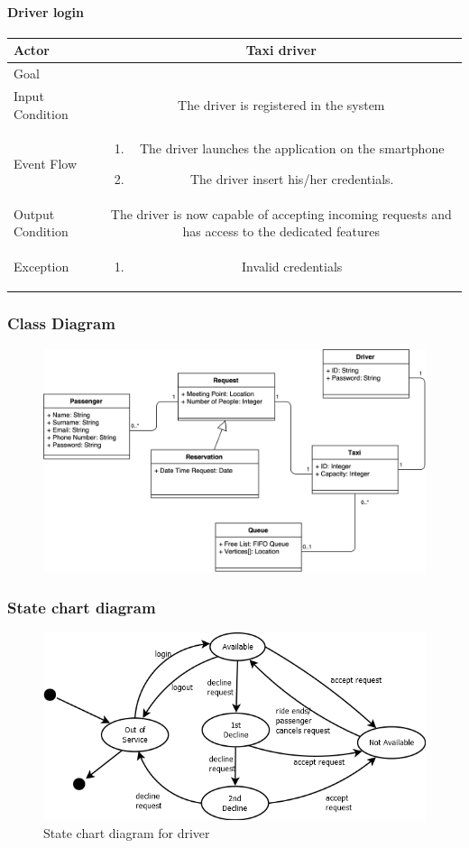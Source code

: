 \documentclass[a4paper,12pt]{article}%
\newcommand{\usecasetable}[6]{
\begin{center}
\def\arraystretch{1.5}
\begin{tabularx}{\textwidth}{|s|C|}
\hline
Actor & #1\\
\hline
Goal & #2\\
\hline
Input Condition & #3 \\
\hline
Event Flow & #4\\
\hline
Output Condition & #5\\
\hline
Exception & #6\\
\hline
\end{tabularx}
\end{center}
}
\begin{document}
\paragraph{Driver login}
\usecasetable{Taxi driver}{}{The driver is registered in the system}
{
\begin{minipage}[b]{11cm}
\begin{enumerate}
\item The driver launches the application on the smartphone
\item The driver insert his/her credentials.
\end{enumerate}
\end{minipage}
}
{The driver is now capable of accepting incoming requests and has access to the dedicated features}
{
\begin{minipage}[b]{11cm}
\begin{enumerate}
\item Invalid credentials
\end{enumerate}
\end{minipage}
}
\break
\begin{landscape}
\subsubsection{Class Diagram}
\begin{figure}[H]
\includegraphics[scale=.25]{class_diagram.png}
\end{figure}
\end{landscape}
\break
\subsubsection{State chart diagram}
\begin{figure}[H]
\centering
\includegraphics[scale=.7]{state_chart_driver.png}
\caption{State chart diagram for driver}
\end{figure}
\break
\end{document}
